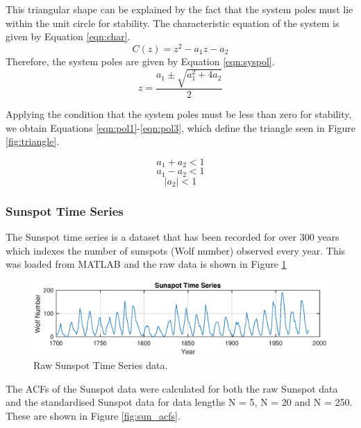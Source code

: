 \noindent
This triangular shape can be explained by the fact that the system poles must lie within the unit circle for stability. The characteristic equation of the system is given by Equation \ref{eqn:char}.
\begin{equation}
C(z)=z^{2}-a_{1} z-a_{2}
\label{eqn:char}
\end{equation}
\noindent
Therefore, the system poles are given by Equation \ref{eqn:syspol}.
\begin{equation}
z=\frac{a_{1} \pm \sqrt{a_{1}^{2}+4 a_{2}}}{2}
\label{eqn:syspol}
\end{equation}

\noindent
Applying the condition that the system poles must be less than zero for stability, we obtain Equations \ref{eqn:pol1}-\ref{eqn:pol3}, which define the triangle seen in Figure \ref{fig:triangle}.

\begin{equation}
a_{1}+a_{2}<1
\label{eqn:pol1}
\end{equation}
\begin{equation}
a_{1}-a_{2}<1
\label{eqn:pol2}
\end{equation}
\begin{equation}
\left|a_{2}\right|<1
\label{eqn:pol3}
\end{equation}

\subsubsection{Sunspot Time Series}

The Sunspot time series is a dataset that has been recorded for over 300 years which indexes the number of sunspots (Wolf number) observed every year. This was loaded from MATLAB and the raw data is shown in Figure \ref{fig:sunspot}

\begin{figure}[H]
    \centering
    \includegraphics[width=16cm]{assignment2figs/sunspot.eps}
    \caption{Raw Sunspot Time Series data.}
    \label{fig:sunspot}
\end{figure}

\noindent
The ACFs of the Sunspot data were calculated for both the raw Sunspot data and the standardised Sunspot data for data lengths N = 5, N = 20 and N = 250. These are shown in Figure \ref{fig:sun_acfs}.

